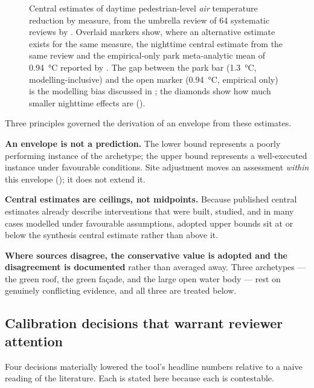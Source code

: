 \begin{figure}[htbp]
\centering

\caption[Per-measure cooling evidence]{Central estimates of daytime
pedestrian-level \emph{air} temperature reduction by measure, from the umbrella
review of 64 systematic reviews by \textcite{keravec2026}. Overlaid markers
show, where an alternative estimate exists for the same measure, the nighttime
central estimate from the same review and the empirical-only park meta-analytic
mean of \qty{0.94}{\degreeCelsius} reported by \textcite{bowler2010}. The gap
between the park bar (\qty{1.3}{\degreeCelsius}, modelling-inclusive) and the
open marker (\qty{0.94}{\degreeCelsius}, empirical only) is the modelling bias
discussed in ; the diamonds show how much smaller
nighttime effects are ().}
\label{fig:cooling-evidence}
\end{figure}

Three principles governed the derivation of an envelope from these estimates.

\textbf{An envelope is not a prediction.} The lower bound represents a poorly
performing instance of the archetype; the upper bound represents a well-executed
instance under favourable conditions. Site adjustment moves an assessment
\emph{within} this envelope (); it does not extend it.

\textbf{Central estimates are ceilings, not midpoints.} Because published
central estimates already describe interventions that were built, studied, and
in many cases modelled under favourable assumptions, adopted upper bounds sit
at or below the synthesis central estimate rather than above it.

\textbf{Where sources disagree, the conservative value is adopted and the
disagreement is documented} rather than averaged away. Three archetypes ---
the green roof, the green fa\c{c}ade, and the large open water body --- rest on
genuinely conflicting evidence, and all three are treated below.

\subsection{Calibration decisions that warrant reviewer attention}
\label{sec:calibration}

Four decisions materially lowered the tool's headline numbers relative to a
naive reading of the literature. Each is stated here because each is
contestable.

